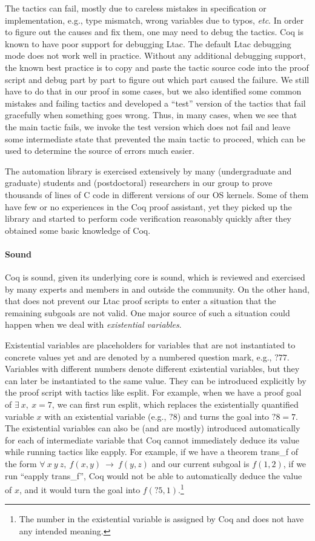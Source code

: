 The tactics can fail, mostly due to careless mistakes in specification or implementation,
e.g., type mismatch, wrong variables due to typos, {\it etc}. In order to figure
out the causes and fix them, one may need to debug the tactics. Coq is known to
have poor support for debugging Ltac. The default Ltac debugging mode does not
work well in practice. Without any additional debugging support, the known best
practice is to copy and paste the tactic source code into the proof script
and debug part by part to figure out which part caused the failure.
We still have to do that in our proof in some cases, but we also identified
some common mistakes and failing tactics and developed a ``test'' version of
the tactics that fail gracefully when
something goes wrong. Thus, in many cases, when we see that the main tactic
fails, we invoke the test version which does not fail and leave some intermediate
state that prevented the main tactic to proceed, which can be used to determine
the source of errors much easier.

The automation library is exercised extensively by many (undergraduate and graduate)
students and (postdoctoral) researchers in our group to prove thousands of
lines of C code in different versions of our OS kernels. Some of them have few or no
experiences in the Coq proof
assistant, yet they picked up the library and started to perform code verification
reasonably quickly after they obtained some basic knowledge of Coq.

\paragraph{Sound}
Coq is sound, given its underlying core is sound, which is reviewed and exercised
by many experts and members in and outside the community. On the other hand,
that does not prevent our Ltac proof scripts to enter a situation that the remaining
subgoals are not valid. One major source of such a situation could happen when we
deal with {\it existential variables}. 

Existential variables are placeholders for
variables that are not instantiated to concrete values yet and are
denoted by a numbered question mark, e.g., $?77$. Variables with different numbers
denote different existential variables, but they can later be instantiated to
the same value. They can be introduced explicitly by the proof script with
tactics like \textsf{esplit}. For example, when we have a proof goal of
$\exists~x,~x=7$, we can first run \textsf{esplit}, which replaces the existentially
quantified variable $x$ with an existential variable (e.g., $?8$) and turns the
goal into $?8=7$. The existential variables can also be (and are mostly) introduced
automatically for each of intermediate variable that Coq cannot immediately
deduce its value while running tactics like \textsf{eapply}.
For example, if we have a theorem \textsf{trans\_f} of the form
$\forall~x~y~z,~f(x,y)~\rightarrow~f(y,z)$ and our current subgoal is $f(1,2)$,
if we run ``\textsf{eapply} \textsf{trans\_f}'', Coq would not be able to
automatically deduce the value of $x$, and it would turn the goal into
$f(?5, 1)$.\footnote{The number in the existential variable is assigned by
Coq and does not have any intended meaning.}

